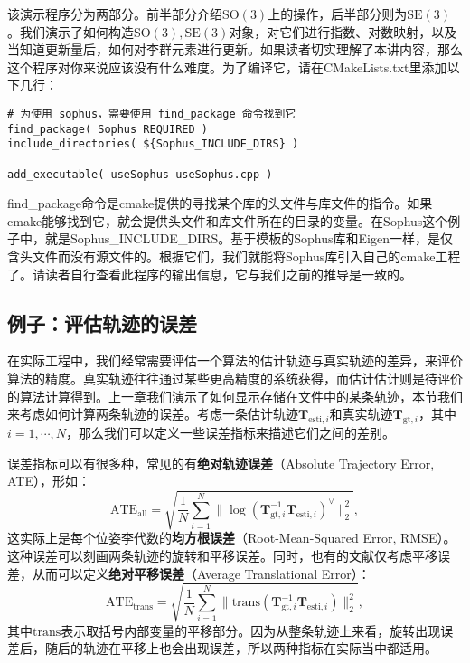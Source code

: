 该演示程序分为两部分。前半部分介绍$\mathrm{SO}(3)$上的操作，后半部分则为$\mathrm{SE}(3)$。我们演示了如何构造$\mathrm{SO}(3),\mathrm{SE}(3)$对象，对它们进行指数、对数映射，以及当知道更新量后，如何对李群元素进行更新。如果读者切实理解了本讲内容，那么这个程序对你来说应该没有什么难度。为了编译它，请在CMakeLists.txt里添加以下几行：

\begin{lstlisting}[caption=slambook/ch4/useSophus/CMakeLists.txt]
# 为使用 sophus，需要使用 find_package 命令找到它
find_package( Sophus REQUIRED )
include_directories( ${Sophus_INCLUDE_DIRS} )

add_executable( useSophus useSophus.cpp )
\end{lstlisting}

find\_package命令是cmake提供的寻找某个库的头文件与库文件的指令。如果cmake能够找到它，就会提供头文件和库文件所在的目录的变量。在Sophus这个例子中，就是Sophus\_INCLUDE\_DIRS。基于模板的Sophus库和Eigen一样，是仅含头文件而没有源文件的。根据它们，我们就能将Sophus库引入自己的cmake工程了。请读者自行查看此程序的输出信息，它与我们之前的推导是一致的。

\subsection{例子：评估轨迹的误差}
在实际工程中，我们经常需要评估一个算法的估计轨迹与真实轨迹的差异，来评价算法的精度。真实轨迹往往通过某些更高精度的系统获得，而估计估计则是待评价的算法计算得到。上一章我们演示了如何显示存储在文件中的某条轨迹，本节我们来考虑如何计算两条轨迹的误差。考虑一条估计轨迹$\bm{T}_{\mathrm{esti},i}$和真实轨迹$\bm{T}_{\mathrm{gt},i}$，其中$i=1,\cdots,N$，那么我们可以定义一些误差指标来描述它们之间的差别。

误差指标可以有很多种，常见的有\textbf{绝对轨迹误差}（Absolute Trajectory Error, ATE），形如：
\begin{equation}
\mathrm{ATE}_{\mathrm{all}} = \sqrt{ \frac{1}{N} \sum_{i=1}^N \| \log( \bm{T}_{\mathrm{gt},i}^{-1} \bm{T}_{\mathrm{esti},i} )^{\vee} \|_2^2},
\end{equation}
这实际上是每个位姿李代数的\textbf{均方根误差}（Root-Mean-Squared Error, RMSE）。这种误差可以刻画两条轨迹的旋转和平移误差。同时，也有的文献仅考虑平移误差\cite{Sturm2012}，从而可以定义\textbf{绝对平移误差}（Average Translational Error）：
\begin{equation}
	\mathrm{ATE}_{\mathrm{trans}} = \sqrt{ \frac{1}{N} \sum_{i=1}^N \| \mathrm{trans}( \bm{T}_{\mathrm{gt},i}^{-1} \bm{T}_{\mathrm{esti},i} ) \|_2^2},
\end{equation}
其中$\mathrm{trans}$表示取括号内部变量的平移部分。因为从整条轨迹上来看，旋转出现误差后，随后的轨迹在平移上也会出现误差，所以两种指标在实际当中都适用。

